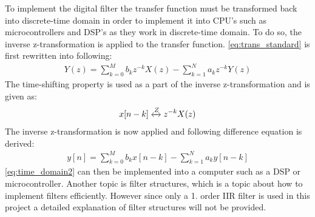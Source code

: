 To implement the digital filter the transfer function must be transformed back into discrete-time domain in order to implement it into CPU's such as microcontrollers and DSP's as they work in discrete-time domain. To do so, the inverse z-transformation is applied to the transfer function. \autoref{eq:trans_standard} is first rewritten into following:
\begin{align}
Y(z) = \sum\limits_{k=0}^{M}b_kz^{-k}X(z) -\sum\limits_{k=1}^{N}a_kz^{-k}Y(z)
\label{eq:z_domain_trans}
\end{align}
The time-shifting property is used as a part of the inverse z-transformation and is given as:
\begin{align}
x[n-k] \xleftrightarrow{Z} z^{-k} X(z)
\label{eq:time_shifting}
\end{align}
The inverse z-transformation is now applied and following difference equation is derived:
\begin{align}
y[n] =  \sum\limits_{k=0}^{M}b_kx[n-k] -\sum\limits_{k=1}^{N}a_ky[n-k]
\label{eq:time_domain2}
\end{align}
\autoref{eq:time_domain2} can then be implemented into a computer such as a DSP or microcontroller. Another topic is filter structures, which is a topic about how to implement filters efficiently. However since only a 1. order IIR filter is used in this project a detailed explanation of filter structures will not be provided.










